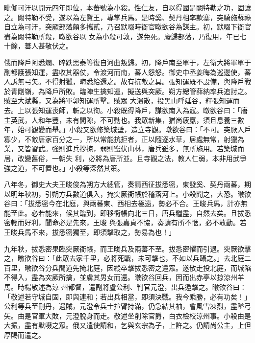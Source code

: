 \begin{pinyinscope}
 毗伽可汗以開元四年即位，本蕃號為小殺。性仁友，自以得國是闕特勒之功，固讓之。闕特勒不受，遂以為左賢王，專掌兵馬。是時奚、契丹相率款塞，突騎施蘇祿自立為可汗，突厥部落頗多攜貳，乃召默啜時衙官暾欲谷為謀主。初，默啜下衙官盡為闕特勒所殺，暾欲谷以
 女為小殺可敦，遂免死。廢歸部落，乃復用，年已七十餘，蕃人甚敬伏之。



 俄而降戶阿悉爛、睟跌思泰等復自河曲叛歸。初，降戶南至單于，左衛大將軍單于副都護張知運，盡收其器仗，令渡河而南，蕃人怨怒。御史中丞姜晦為巡邊使，蕃人訴無弓矢。不得射獵，晦悉給還之。故有抗敵之具。張知運既不設備，與降戶戰於青剛嶺，為降戶所敗。臨陣生擒知運，擬送與突厥。朔方總管薛納率兵追討之。賊至大斌縣，又為將軍郭知運所擊。賊眾
 大潰散，投黑山呼延谷，釋張知運而去。上以張知運喪師，斬之以徇。小殺既得降戶，謀欲南入為寇。暾欲谷曰：「唐主英武，人和年豐，未有間隙，不可動也。我眾新集，猶尚疲羸，須且息養三數年，始可觀變而舉。」小殺又欲修築城壁，造立寺觀。暾欲谷曰：「不可。突厥人戶寡少，不敵唐家百分之一，所以常能抗拒者，正以隨逐水草，居處無常，射獵為業，又皆習武。強則進兵抄掠，弱則竄伏山林，唐兵雖多，無所施用。若築城而居，改變舊俗，一朝失
 利，必將為唐所並。且寺觀之法，教人仁弱，本非用武爭強之道，不可置也。」小殺等深然其策。



 八年冬，御史大夫王晙俊為朔方大總管，奏請西征拔悉密，東發奚、契丹兩蕃，期以明年秋初，引朔方兵數道俱入，掩突厥衙帳於稽落河上。小殺聞之，大恐。暾欲谷曰：「拔悉密今在北庭，與兩蕃東、西相去極遠，勢必不合。王晙兵馬，計亦無能至此。必若能來，候其臨到，即移衙帳向北三日，唐兵糧盡，自然去矣。且拔悉密輕而好利，聞命必是先來，王晙
 與張嘉貞不協，奏請有所不愜，必不敢動。若王晙兵馬不來，拔悉密獨至，即須擊取之，勢易為也！」



 九年秋，拔悉密果臨突厥衙帳，而王晙兵及兩蕃不至。拔悉密懼而引退。突厥欲擊之，暾欲谷曰：「此眾去家千里，必將死戰，未可擊也，不如以兵躡之。」去北庭二百里，暾欲谷分兵間道先掩北庭，因縱卒擊拔悉密之還眾。遂散走投北庭，而城陷不得入，盡為突厥所擒，並虜其男女而還。暾欲谷回兵，因而出赤亭以掠涼州羊馬。時楊敬述為涼
 州都督，遣副將盧公利、判官元澄，出兵邀擊之。暾欲谷曰：「敬述若守城自固，即與連和；若出兵相當，即須決戰。我今乘勝，必有功矣！」公利等兵至刪丹，遇賊，元澄令兵士揎臂持滿，仍急結其袖，會風雪凍烈，盡墜弓矢。由是官軍大敗，元澄脫身而走。敬述坐削除官爵，白衣檢校涼州事。小殺由是大振，盡有默啜之眾。俄又遣使請和，乞與玄宗為子，上許之。仍請尚公主，上但厚賜而遣之。




\end{pinyinscope}
